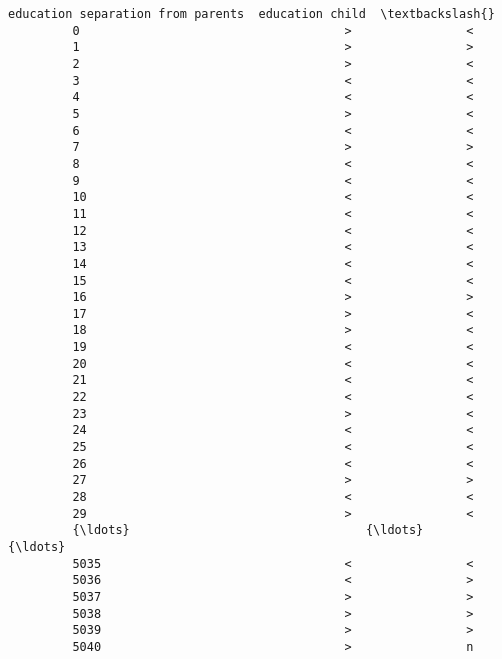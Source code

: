 \documentclass[11pt]{article}
\begin{document}
\begin{Verbatim}[commandchars=\\\{\}]
               education separation from parents  education child  \textbackslash{}
         0                                     >                <   
         1                                     >                >   
         2                                     >                <   
         3                                     <                <   
         4                                     <                <   
         5                                     >                <   
         6                                     <                <   
         7                                     >                >   
         8                                     <                <   
         9                                     <                <   
         10                                    <                <   
         11                                    <                <   
         12                                    <                <   
         13                                    <                <   
         14                                    <                <   
         15                                    <                <   
         16                                    >                >   
         17                                    >                <   
         18                                    >                <   
         19                                    <                <   
         20                                    <                <   
         21                                    <                <   
         22                                    <                <   
         23                                    >                <   
         24                                    <                <   
         25                                    <                <   
         26                                    <                <   
         27                                    >                >   
         28                                    <                <   
         29                                    >                <   
         {\ldots}                                 {\ldots}              {\ldots}   
         5035                                  <                <   
         5036                                  <                >   
         5037                                  >                >   
         5038                                  >                >   
         5039                                  >                >   
         5040                                  >                n   

\end{Verbatim}
\end{document}
